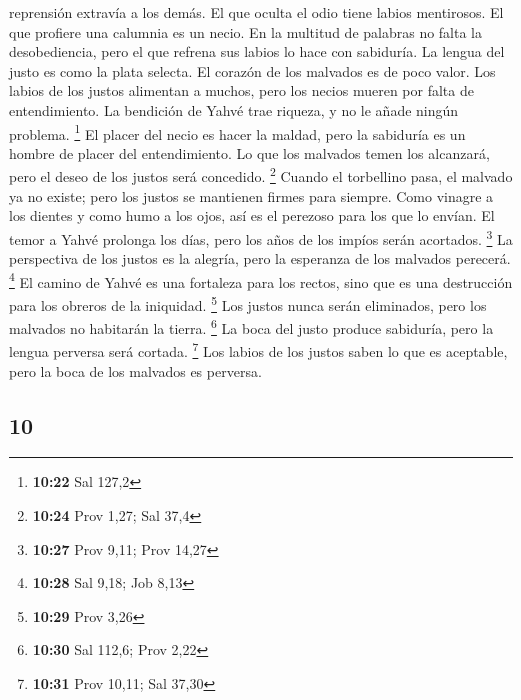 \begin{paracol}{2}
reprensión extravía a los demás.  El que oculta el odio
tiene labios mentirosos. El que profiere una calumnia es un necio.
 En la multitud de palabras no falta la desobediencia,
pero el que refrena sus labios lo hace con sabiduría.  La
lengua del justo es como la plata selecta. El corazón de los malvados es
de poco valor.  Los labios de los justos alimentan a
muchos, pero los necios mueren por falta de entendimiento.
 La bendición de Yahvé trae riqueza, y no le añade ningún
problema. \footnote{\textbf{10:22} Sal 127,2}  El placer
del necio es hacer la maldad, pero la sabiduría es un hombre de placer
del entendimiento.  Lo que los malvados temen los
alcanzará, pero el deseo de los justos será concedido. \footnote{\textbf{10:24}
  Prov 1,27; Sal 37,4}  Cuando el torbellino pasa, el
malvado ya no existe; pero los justos se mantienen firmes para siempre.
 Como vinagre a los dientes y como humo a los ojos, así
es el perezoso para los que lo envían.  El temor a Yahvé
prolonga los días, pero los años de los impíos serán acortados.
\footnote{\textbf{10:27} Prov 9,11; Prov 14,27}  La
perspectiva de los justos es la alegría, pero la esperanza de los
malvados perecerá. \footnote{\textbf{10:28} Sal 9,18; Job 8,13}
 El camino de Yahvé es una fortaleza para los rectos,
sino que es una destrucción para los obreros de la iniquidad.
\footnote{\textbf{10:29} Prov 3,26}  Los justos nunca
serán eliminados, pero los malvados no habitarán la tierra. \footnote{\textbf{10:30}
  Sal 112,6; Prov 2,22}  La boca del justo produce
sabiduría, pero la lengua perversa será cortada. \footnote{\textbf{10:31}
  Prov 10,11; Sal 37,30}  Los labios de los justos saben
lo que es aceptable, pero la boca de los malvados es perversa.

\switchcolumn
\begin{otherlanguage}{english}

\hypertarget{section-19}{%
\section{10}\label{section-19}}


\end{otherlanguage}
\end{paracol}
